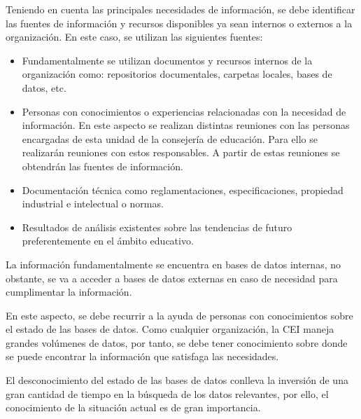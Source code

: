 Teniendo en cuenta las principales necesidades de información, se debe identificar las fuentes de información y recursos disponibles ya sean internos o externos a la organización. En este caso, se utilizan las siguientes fuentes:
\begin{itemize}
	\item Fundamentalmente se utilizan documentos y recursos internos de la organización como: repositorios documentales, carpetas locales, bases de datos, etc.
	\item Personas con conocimientos o experiencias relacionadas con la necesidad de información. En este aspecto se realizan distintas reuniones con las personas encargadas de esta unidad de la consejería de educación. Para ello se realizarán reuniones con estos responsables. A partir de estas reuniones se obtendrán las fuentes de información.
	\item Documentación técnica como reglamentaciones, especificaciones, propiedad industrial e intelectual o normas.
	\item Resultados de análisis existentes sobre las tendencias de futuro preferentemente en el ámbito educativo.
\end{itemize}


La información fundamentalmente se encuentra en bases de datos internas, no obstante, se va a acceder a bases de datos externas en caso de necesidad para cumplimentar la información. 

En este aspecto, se debe recurrir a la ayuda de personas con conocimientos sobre el estado de las bases de datos. Como cualquier organización, la CEI maneja grandes volúmenes de datos, por tanto, se debe tener conocimiento sobre donde se puede encontrar la información que satisfaga las necesidades. 

El desconocimiento del estado de las bases de datos conlleva la inversión de una gran cantidad de tiempo en la búsqueda de los datos relevantes, por ello, el conocimiento de la situación actual es de gran importancia.

